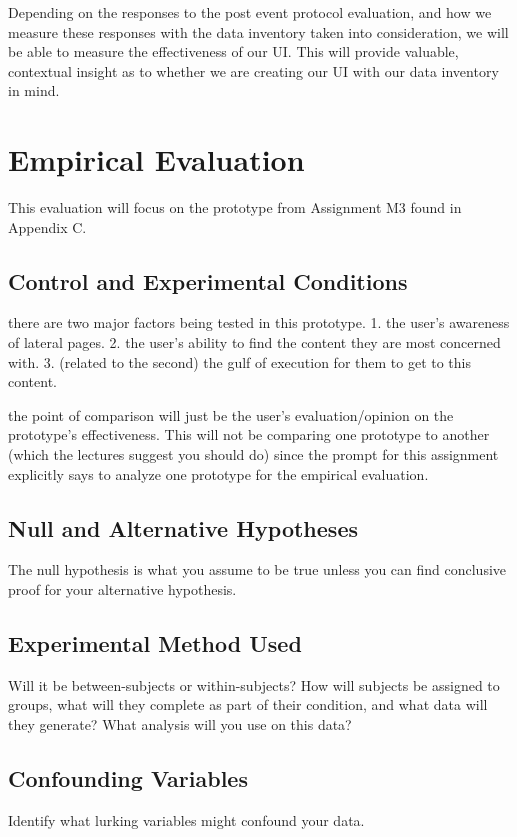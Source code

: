 Depending on the responses to the post event protocol evaluation, and how we measure these responses with the data inventory taken into consideration, we will be able to measure the effectiveness of our UI. This will provide valuable, contextual insight as to whether we are creating our UI with our data inventory in mind.

\section{Empirical Evaluation}
This evaluation will focus on the prototype from Assignment M3 found in Appendix C.

\subsection{Control and Experimental Conditions}
 there are two major factors being tested in this prototype. 1. the user's awareness of lateral pages. 2. the user's ability to find the content they are most concerned with. 3. (related to the second) the gulf of execution for them to get to this content.

 the point of comparison will just be the user's evaluation/opinion on the prototype's effectiveness. This will not be comparing one prototype to another (which the lectures suggest you should do) since the prompt for this assignment explicitly says to analyze one prototype for the empirical evaluation.

\subsection{Null and Alternative Hypotheses}
The null hypothesis is what you assume to be true unless you can find conclusive proof for your alternative hypothesis.

\subsection{Experimental Method Used}
Will it be between-subjects or within-subjects? How will subjects be assigned to groups, what will they complete as part of their condition, and what data will they generate? What analysis will you use on this data?

\subsection{Confounding Variables}
Identify what lurking variables might confound your data.

